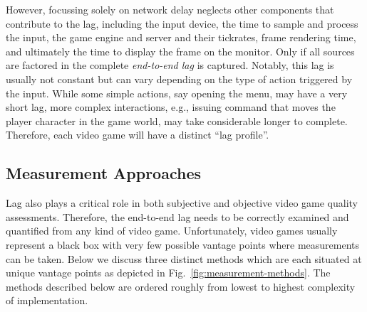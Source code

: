However, focussing solely on network delay neglects other components that contribute to the lag, including the input device, the time to sample and process the input, the game engine and server and their tickrates, frame rendering time, and ultimately the time to display the frame on the monitor. Only if all sources are factored in the complete \textit{end-to-end lag} is captured. Notably, this lag is usually not constant but can vary depending on the type of action triggered by the input. While some simple actions, say opening the menu, may have a very short lag, more complex interactions, e.g., issuing command that moves the player character in the game world, may take considerable longer to complete. %
Therefore, each video game will have a distinct ``lag profile''.




\subsection{Measurement Approaches}
\label{sec:measurementapproaches}

Lag also plays a critical role in both subjective and objective video game quality assessments. Therefore, the end-to-end lag needs to be correctly examined and quantified from any kind of video game. Unfortunately, video games usually represent a black box with very few possible vantage points where measurements can be taken. Below we discuss three distinct methods which are each situated at unique vantage points as depicted in Fig.~\ref{fig:measurement-methods}.
The methods described below are ordered roughly from lowest to highest complexity of implementation.

